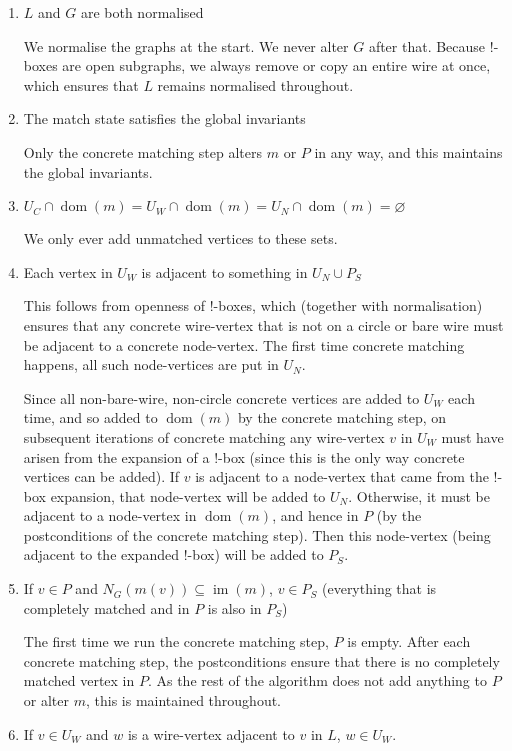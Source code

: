 \documentclass{article}
\DeclareMathOperator{\dom}{dom}
\DeclareMathOperator{\im}{im}
\begin{document}
\begin{enumerate}[label=(\roman*),ref=(\roman*)]
  \item $L$ and $G$ are both normalised

  We normalise the graphs at the start.  We never alter $G$ after that.  Because $!$-boxes are open subgraphs, we always remove or copy an entire wire at once, which ensures that $L$ remains normalised throughout.
  \item The match state satisfies the global invariants

  Only the concrete matching step alters $m$ or $P$ in any way, and this maintains the global invariants.
  \item $U_C\cap\dom(m) = U_W\cap\dom(m) = U_N\cap\dom(m) = \varnothing$

  We only ever add unmatched vertices to these sets.
  \item Each vertex in $U_W$ is adjacent to something in $U_N\cup P_S$

  This follows from openness of $!$-boxes, which (together with normalisation) ensures that any concrete wire-vertex that is not on a circle or bare wire must be adjacent to a concrete node-vertex.  The first time concrete matching happens, all such node-vertices are put in $U_N$.
  
  Since all non-bare-wire, non-circle concrete vertices are added to $U_W$ each time, and so added to $\dom(m)$ by the concrete matching step, on subsequent iterations of concrete matching any wire-vertex $v$ in $U_W$ must have arisen from the expansion of a $!$-box (since this is the only way concrete vertices can be added).  If $v$ is adjacent to a node-vertex that came from the $!$-box expansion, that node-vertex will be added to $U_N$.  Otherwise, it must be adjacent to a node-vertex in $\dom(m)$, and hence in $P$ (by the postconditions of the concrete matching step).  Then this node-vertex (being adjacent to the expanded $!$-box) will be added to $P_S$.
  \item If $v \in P$ and $N_G(m(v)) \subseteq \im(m)$, $v \in P_S$ (everything that is completely matched and in $P$ is also in $P_S$)

  The first time we run the concrete matching step, $P$ is empty.  After each concrete matching step, the postconditions ensure that there is no completely matched vertex in $P$.  As the rest of the algorithm does not add anything to $P$ or alter $m$, this is maintained throughout.
  \item If $v \in U_W$ and $w$ is a wire-vertex adjacent to $v$ in $L$, $w \in U_W$.


\end{enumerate}
\end{document}
